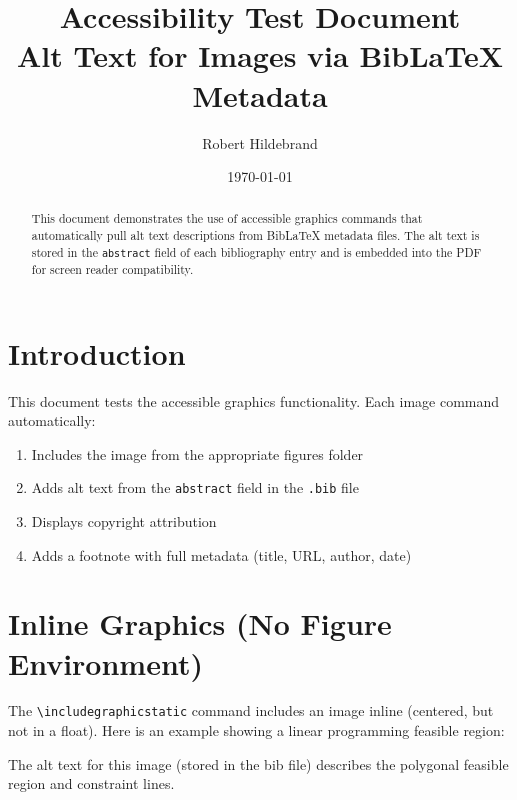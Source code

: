 \documentclass[12pt,letterpaper]{article}
\title{Accessibility Test Document\\{\large Alt Text for Images via BibLaTeX Metadata}}
\author{Robert Hildebrand}
\date{\today}
\begin{document}
\maketitle

\begin{abstract}
This document demonstrates the use of accessible graphics commands that automatically
pull alt text descriptions from BibLaTeX metadata files. The alt text is stored in
the \texttt{abstract} field of each bibliography entry and is embedded into the PDF
for screen reader compatibility.
\end{abstract}

\tableofcontents
\newpage

\section{Introduction}

This document tests the accessible graphics functionality. Each image command
automatically:
\begin{enumerate}
  \item Includes the image from the appropriate figures folder
  \item Adds alt text from the \texttt{abstract} field in the \texttt{.bib} file
  \item Displays copyright attribution
  \item Adds a footnote with full metadata (title, URL, author, date)
\end{enumerate}

\section{Inline Graphics (No Figure Environment)}

The \verb|\includegraphicstatic| command includes an image inline (centered, but
not in a float). Here is an example showing a linear programming feasible region:


The alt text for this image (stored in the bib file) describes the polygonal
feasible region and constraint lines.
\end{document}
